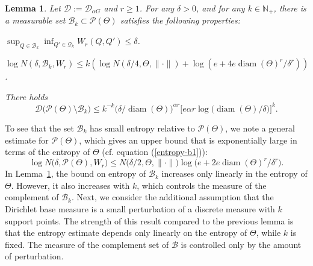 \documentclass[MSNbibl,number,citesort]{arxbj}
\newcommand{\eqref}[1]{(\ref{#1})}
\def\comment{}
\newtheorem{lemma}{Lemma}[section]
\newcommand{\Nat}{\mathbb{N}}
\newcommand{\Bcal}{\mathcal{B}}
\newcommand{\Dcal}{\mathcal{D}}
\newcommand{\Pcal}{\mathscr{P}}
\newcommand{\Qcal}{\mathcal{Q}}
\newcommand{\m}{k}
\newcommand{\Prob}{\mathbb{P}}
\newcommand{\Diam}{\operatorname{diam}}
\newcommand{\DP}{\mathscr{D}}
\newcommand{\Wr}{W_r}
\begin{document}
%
\begin{lemma}
\label{Lem-DP-Approx}
Let $\Dcal:= \DP_{\alpha G}$ and $r\geq1$. For any $\delta> 0$,
and for any $\m\in\Nat_+$, there is a
measurable set $\Bcal_\m\subset\Pcal(\Theta)$ satisfies
the following properties:
%
\begin{longlist}[(a)]
%
\item[(a)] $\sup_{Q\in\Bcal_\m} \inf_{Q'\in\Qcal_\m} \Wr
(Q,Q') \leq
\delta$.
%
\item[(b)] $\log N(\delta, \Bcal_\m, \Wr)
\leq\m(\log N(\delta/4, \Theta, \|\cdot\|) + \log(e+ 4e\Diam
(\Theta
)^r/\delta^r))$.
%
\item[(c)] There holds
%
\[
\Dcal \bigl(\Pcal(\Theta) \setminus\Bcal_\m \bigr) \leq
\m^{-\m} \bigl(\delta/\Diam(\Theta) \bigr)^{\alpha r} \bigl[e\alpha
r \log \bigl(\operatorname{diam}(\Theta)/\delta \bigr) \bigr]^\m.
\]

\end{longlist}
%
\end{lemma}

To see that the set $\Bcal_\m$ has small entropy relative to $\Pcal
(\Theta)$,
we note a general estimate for $\Pcal(\Theta)$, which gives an upper bound
that is exponentially large in terms of the entropy of $\Theta$
(cf. equation \eqref{entropy-b1}):
%
\[
\log N \bigl(\delta,\Pcal(\Theta), \Wr \bigr) \leq N\bigl(\delta/2, \Theta, \| \cdot
\|\bigr) \log \bigl(e + 2e\Diam(\Theta)^r/\delta^r \bigr).
\]
%
In Lemma~\ref{Lem-DP-Approx}, the bound on entropy of $\Bcal_k$
increases only linearly in the entropy of $\Theta$.
However, it also increases with $k$, which controls the measure of
the complement of $\Bcal_k$. Next, we consider the additional assumption
that the Dirichlet base measure is a small perturbation of a discrete measure
with $k$ support points. The strength of this result
compared to the previous lemma is that the entropy estimate depends only
linearly on the entropy of $\Theta$, while $k$ is fixed. The measure
of the complement set of $\Bcal$ is controlled only
by the amount of perturbation.
\end{document}
